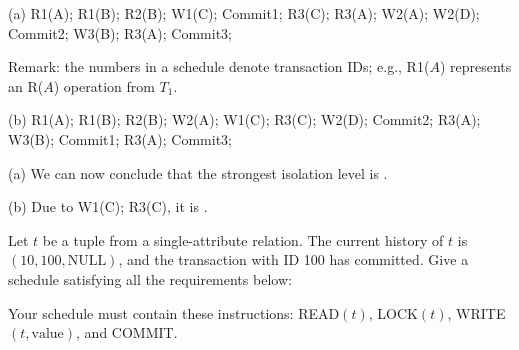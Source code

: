 \vgap

(a) R1(A); R1(B); R2(B); W1(C); Commit1; R3(C); R3(A); W2(A); W2(D); Commit2; W3(B); R3(A); Commit3;

Remark: the numbers in a schedule denote transaction IDs; e.g., R1($A$) represents an R($A$) operation from $T_1$.

\vgap

(b) R1(A); R1(B); R2(B); W2(A); W1(C); R3(C); W2(D); Commit2; R3(A); W3(B); Commit1; R3(A); Commit3;

\begin{sol}
     (a)
    We can now conclude that the strongest isolation level is .


    (b) Due to W1(C); R3(C), it is .
\end{sol}

\pagebreak



 Let $t$ be a tuple from a single-attribute relation. The current history of $t$ is $(10, 100, \text{NULL})$, and the transaction with ID 100 has committed. Give a schedule satisfying all the requirements below:


\noindent Your schedule must contain these instructions: READ$(t)$, LOCK$(t)$, WRITE$(t, \text{value})$, and COMMIT.

